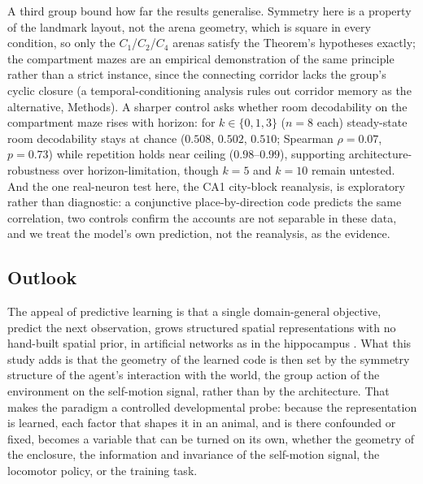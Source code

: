 A third group bound how far the results generalise. Symmetry here is a property of the landmark layout,
not the arena geometry, which is square in every condition, so only the $C_1$/$C_2$/$C_4$ arenas satisfy
the Theorem's hypotheses exactly; the compartment mazes are an empirical demonstration of the same
principle rather than a strict instance, since the connecting corridor lacks the group's cyclic closure
(a temporal-conditioning analysis rules out corridor memory as the alternative, Methods). A sharper
control asks whether room decodability on the compartment maze rises with horizon: for $k \in \{0,1,3\}$
($n = 8$ each) steady-state room decodability stays at chance ($0.508$, $0.502$, $0.510$; Spearman
$\rho = 0.07$, $p = 0.73$) while repetition holds near ceiling ($0.98$--$0.99$), supporting
architecture-robustness over horizon-limitation, though $k = 5$ and $k = 10$ remain untested. And the one
real-neuron test here, the CA1 city-block reanalysis, is exploratory rather than diagnostic: a
conjunctive place-by-direction code predicts the same correlation, two controls confirm the accounts are
not separable in these data, and we treat the model's own prediction, not the reanalysis, as the
evidence.

\subsection*{Outlook}

The appeal of predictive learning is that a single domain-general objective, predict the next
observation, grows structured spatial representations with no hand-built spatial prior, in artificial
networks as in the hippocampus \citep{levenstein2024, stachenfeld2017}. What this study adds is that the
geometry of the learned code is then set by the symmetry structure of the agent's interaction with the
world, the group action of the environment on the self-motion signal, rather than by the architecture.
That makes the paradigm a controlled developmental probe: because the representation is learned, each
factor that shapes it in an animal, and is there confounded or fixed, becomes a variable that can be
turned on its own, whether the geometry of the enclosure, the information and invariance of the
self-motion signal, the locomotor policy, or the training task.

